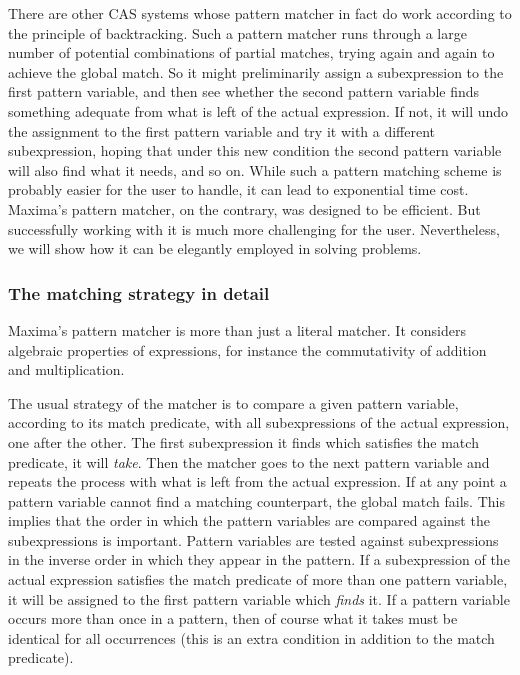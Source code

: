 \documentclass[../Maxima_Workbook.tex]{subfiles}
\begin{document}
\lz There are other CAS systems whose pattern matcher in fact do work according to the principle of backtracking. Such a pattern matcher runs through a large number of potential combinations of partial matches, trying again and again to achieve the global match. So it might preliminarily assign a subexpression to the first pattern variable, and then see whether the second pattern variable finds something adequate from what is left of the actual expression. If not, it will undo the assignment to the first pattern variable and try it with a different subexpression, hoping that under this new condition the second pattern variable will also find what it needs, and so on. While such a pattern matching scheme is probably easier for the user to handle, it can lead to exponential time cost. Maxima's pattern matcher, on the contrary, was designed to be efficient. But successfully working with it is much more challenging for the user. Nevertheless, we will show how it can be elegantly employed in solving problems. 

\subsubsection{The matching strategy in detail}

Maxima's pattern matcher is more than just a literal matcher. It considers algebraic properties of expressions, for instance the commutativity of addition and multiplication. 

\lz The usual strategy of the matcher is to compare a given pattern variable, according to its match predicate, with all subexpressions of the actual expression, one after the other. The first subexpression it finds which satisfies the match predicate, it will \emph{take}. Then the matcher goes to the next pattern variable and repeats the process with what is left from the actual expression. If at any point a pattern variable cannot find a matching counterpart, the global match fails. This implies that the order in which the pattern variables are compared against the subexpressions is important. Pattern variables are tested against subexpressions in the inverse order in which they appear in the pattern. If a subexpression of the actual expression satisfies the match predicate of more than one pattern variable, it will be assigned to the first pattern variable which \emph{finds} it. If a pattern variable occurs more than once in a pattern, then of course what it takes must be identical for all occurrences (this is an extra condition in addition to the match predicate).
\end{document}
